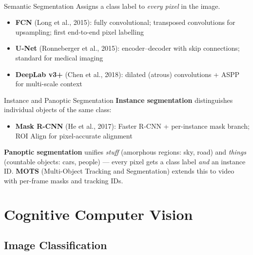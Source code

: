 \begin{v3topic}{Semantic Segmentation}
    Assigns a class label to \emph{every pixel} in the image\textsuperscript{\cite[][pp.~110--112]{fleuretLittleBookDeep}}.
    \begin{itemize}
        \item \textbf{FCN} (Long et al., 2015): fully convolutional; transposed convolutions for upsampling; first end-to-end pixel labelling
        \item \textbf{U-Net} (Ronneberger et al., 2015): encoder--decoder with skip connections; standard for medical imaging
        \item \textbf{DeepLab v3+} (Chen et al., 2018): dilated (atrous) convolutions + ASPP for multi-scale context
    \end{itemize}

\end{v3topic}
\begin{v3topic}{Instance and Panoptic Segmentation}
    \textbf{Instance segmentation} distinguishes individual objects of the same class:
    \begin{itemize}
        \item \textbf{Mask R-CNN} (He et al., 2017): Faster R-CNN + per-instance mask branch; ROI Align for pixel-accurate alignment
    \end{itemize}
    \textbf{Panoptic segmentation} unifies \emph{stuff} (amorphous regions: sky, road) and \emph{things} (countable objects: cars, people) --- every pixel gets a class label \emph{and} an instance ID.
    \textbf{MOTS} (Multi-Object Tracking and Segmentation) extends this to video with per-frame masks and tracking IDs.
\end{v3topic}


\section{Cognitive Computer Vision}

\subsection{Image Classification}

